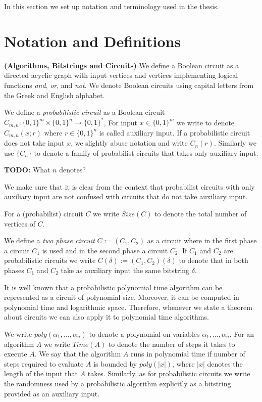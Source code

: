 In this section we set up notation and terminology used in the thesis.
%
\section{Notation and Definitions}
\textbf{(Algorithms, Bitstrings and Circuits)}
We define a Boolean circuit as a directed acyclic graph with input vertices and vertices implementing logical functions \textit{and}, \textit{or}, and \textit{not}.
We denote Boolean circuits using capital letters from the Greek and English alphabet.

We define a \textit{probabilistic circuit} as a Boolean circuit $C_{m,n} : \{0,1\}^{m} \times \{0,1\}^{n} \rightarrow \{0,1\}^{*}$,
For input $x \in \{0,1\}^{m}$ we write to denote $C_{m,n}(x;r)$ where $r \in \{0,1\}^{n}$ is called auxiliary input.
If a probabilistic circuit does not take input $x$, we slightly abuse notation and write $C_{n}(r)$.
Similarly we use $\{C_n\}$ to denote a family of probabilist circuits that takes only auxiliary input.
\begin{todo}
  \textbf{TODO:} What $n$ denotes?
\end{todo}

We make sure that it is clear from the context that probabilist circuits with only auxiliary input
are not confused with circuits that do not take auxiliary input.

For a (probabilist) circuit $C$ we write $\mathit{Size}(C)$ to denote the total number of vertices of $C$.

We define a \textit{two phase circuit} $C := (C_1, C_2)$ as a circuit where in the first phase a circuit $C_1$ is used and in the second phase a circuit $C_2$.
If $C_1$ and $C_2$ are probabilistic circuits we write $C(\delta) := (C_1, C_2)(\delta)$ to denote that in both phases $C_1$ and $C_2$ take
as auxiliary input the same bitstring $\delta$.

It is well known \cite{Arora:2009:CCM:1540612} that a probabilistic polynomial time algorithm can be represented as a circuit of polynomial size.
Moreover, it can be computed in polynomial time and logarithmic space.
Therefore, whenever we state a theorem about circuits we can also apply it to polynomial time algorithms.

We write $\mathit{poly}(\alpha_1, \dots, \alpha_n)$ to denote a polynomial on variables $\alpha_1, \dots, \alpha_n$.
For an algorithm $A$ we write $\mathit{Time}(A)$ to denote the number of steps it takes to execute $A$.
We say that the algorithm $A$ runs in polynomial time if number of steps required to evaluate $A$ is bounded by $poly(|x|)$, where $|x|$ denotes
the length of the input that $A$ takes.
Similarly, as for probabilistic circuits we write the randomness used by a probabilistic algorithm explicitly as a bitstring provided as an auxiliary input.

